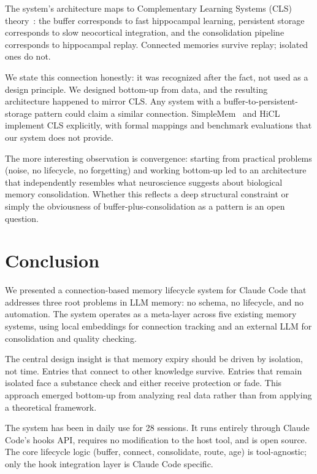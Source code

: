 \documentclass[11pt,a4paper]{article}
\begin{document}
The system's architecture maps to Complementary Learning Systems (CLS) theory~\cite{mcclelland1995cls}: the buffer corresponds to fast hippocampal learning, persistent storage corresponds to slow neocortical integration, and the consolidation pipeline corresponds to hippocampal replay.
Connected memories survive replay; isolated ones do not.

We state this connection honestly: it was recognized after the fact, not used as a design principle.
We designed bottom-up from data, and the resulting architecture happened to mirror CLS.
Any system with a buffer-to-persistent-storage pattern could claim a similar connection.
SimpleMem~\cite{simplemem} and HiCL~\cite{hicl} implement CLS explicitly, with formal mappings and benchmark evaluations that our system does not provide.

The more interesting observation is convergence: starting from practical problems (noise, no lifecycle, no forgetting) and working bottom-up led to an architecture that independently resembles what neuroscience suggests about biological memory consolidation.
Whether this reflects a deep structural constraint or simply the obviousness of buffer-plus-consolidation as a pattern is an open question.


\section{Conclusion}

We presented a connection-based memory lifecycle system for Claude Code that addresses three root problems in LLM memory: no schema, no lifecycle, and no automation.
The system operates as a meta-layer across five existing memory systems, using local embeddings for connection tracking and an external LLM for consolidation and quality checking.

The central design insight is that memory expiry should be driven by isolation, not time.
Entries that connect to other knowledge survive.
Entries that remain isolated face a substance check and either receive protection or fade.
This approach emerged bottom-up from analyzing real data rather than from applying a theoretical framework.

The system has been in daily use for 28 sessions.
It runs entirely through Claude Code's hooks API, requires no modification to the host tool, and is open source.
The core lifecycle logic (buffer, connect, consolidate, route, age) is tool-agnostic; only the hook integration layer is Claude Code specific.
\end{document}
